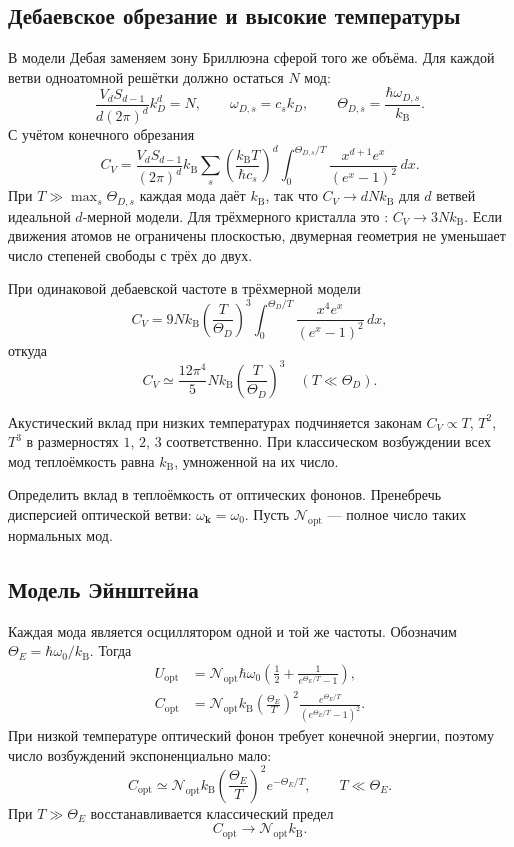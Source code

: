 \documentclass[../final.tex]{subfiles}
\begin{document}
\subsection*{Дебаевское обрезание и высокие температуры}

В модели Дебая заменяем зону Бриллюэна сферой того же объёма.
Для каждой ветви одноатомной решётки должно остаться $N$ мод:
\[
    \frac{V_d S_{d-1}}{d(2\pi)^d}k_D^d=N,
    \qquad \omega_{D,s}=c_sk_D,
    \qquad \Theta_{D,s}=\frac{\hbar\omega_{D,s}}{k_{\mathrm B}}.
\]
С учётом конечного обрезания
\[
    C_V=\frac{V_d S_{d-1}}{(2\pi)^d}
       k_{\mathrm B}\sum_s
       \left(\frac{k_{\mathrm B}T}{\hbar c_s}\right)^d
       \int_0^{\Theta_{D,s}/T}
          \frac{x^{d+1}e^x}{(e^x-1)^2}\,dx.
\]
При $T\gg\max_s\Theta_{D,s}$ каждая мода даёт $k_{\mathrm B}$,
так что $C_V\to dNk_{\mathrm B}$ для $d$ ветвей идеальной
$d$-мерной модели. Для трёхмерного кристалла это
: $C_V\to3Nk_{\mathrm B}$.
Если движения атомов не ограничены плоскостью, двумерная геометрия
не уменьшает число степеней свободы с трёх до двух.

При одинаковой дебаевской частоте в трёхмерной модели
\[
    C_V=9Nk_{\mathrm B}\left(\frac T{\Theta_D}\right)^3
       \int_0^{\Theta_D/T}\frac{x^4e^x}{(e^x-1)^2}\,dx,
\]
откуда
\[
    C_V\simeq\frac{12\pi^4}{5}Nk_{\mathrm B}
       \left(\frac T{\Theta_D}\right)^3
       \quad(T\ll\Theta_D).
\]

\answer
Акустический вклад при низких температурах подчиняется законам
$C_V\propto T$, $T^2$, $T^3$ в размерностях $1$, $2$, $3$ соответственно.
При классическом возбуждении всех мод теплоёмкость равна
$k_{\mathrm B}$, умноженной на их число.
\endgroup

\clearpage
{}

\condition
Определить вклад в теплоёмкость от оптических фононов.
Пренебречь дисперсией оптической ветви: $\omega_{\boldsymbol k}=\omega_0$.
Пусть $\mathcal N_{\mathrm{opt}}$ --- полное число таких нормальных мод.

\solution

\subsection*{Модель Эйнштейна}

Каждая мода является осциллятором одной и той же частоты. Обозначим
$\Theta_E=\hbar\omega_0/k_{\mathrm B}$. Тогда
\begin{align*}
    U_{\mathrm{opt}}&=\mathcal N_{\mathrm{opt}}\hbar\omega_0
       \left(\frac12+\frac1{e^{\Theta_E/T}-1}\right),\\
    C_{\mathrm{opt}}&=\mathcal N_{\mathrm{opt}}k_{\mathrm B}
       \left(\frac{\Theta_E}{T}\right)^2
       \frac{e^{\Theta_E/T}}{(e^{\Theta_E/T}-1)^2}.
\end{align*}
При низкой температуре оптический фонон требует конечной энергии,
поэтому число возбуждений экспоненциально мало:
\[
    C_{\mathrm{opt}}\simeq\mathcal N_{\mathrm{opt}}k_{\mathrm B}
       \left(\frac{\Theta_E}{T}\right)^2e^{-\Theta_E/T},
       \qquad T\ll\Theta_E.
\]
При $T\gg\Theta_E$ восстанавливается классический предел
\[
    C_{\mathrm{opt}}\longrightarrow\mathcal N_{\mathrm{opt}}k_{\mathrm B}.
\]
\end{document}
